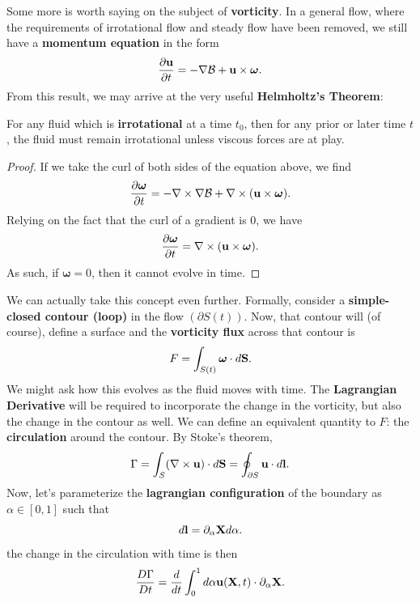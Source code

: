 Some more is worth saying on the subject of \textbf{vorticity}. In a general flow, where the requirements of irrotational flow and steady flow have been removed, we still have a \textbf{momentum equation} in the form
\[
\frac{\partial {\bf u}}{\partial t} = - \nabla \mathcal{B} + {\bf u} \times \boldsymbol{\omega}.
\]
From this result, we may arrive at the very useful \textbf{Helmholtz's Theorem}:
\vspace{0.6 cm}
\begin{theorem}
For any fluid which is \textbf{irrotational} at a time $t_0$, then for any prior or later time $t$, the fluid must remain irrotational unless viscous forces are at play.
\end{theorem}
\begin{proof}
    If we take the curl of both sides of the equation above, we find
    \[
    \frac{\partial \boldsymbol{\omega}}{\partial t} = - \nabla \times \nabla \mathcal{B} + \nabla \times ({\bf u} \times \boldsymbol{\omega}).
    \]
    Relying on the fact that the curl of a gradient is 0, we have
    \[
    \frac{\partial \boldsymbol{\omega}}{\partial t} = \nabla \times ({\bf u} \times \boldsymbol{\omega}).
    \]
    As such, if $\boldsymbol{\omega} = 0$, then it cannot evolve in time.
\end{proof}
\vspace{0.6cm}
We can actually take this concept even further. Formally, consider a \textbf{simple-closed contour (loop)} in the flow $(\partial S(t))$.  Now, that contour will (of course), define a surface and the \textbf{vorticity flux} across that contour is
\[
F = \int_{S(t)} \boldsymbol{\omega} \cdot d{\bf S}. 
\]
We might ask how this evolves as the fluid moves with time. The \textbf{Lagrangian Derivative} will be required to incorporate the change in the vorticity, but also the change in the contour as well. We can define an equivalent quantity to $F$: the \textbf{circulation} around the contour. By Stoke's theorem,
\[
\Gamma = \int_S (\nabla \times  {\bf u}) \cdot d{\bf S} = \oint_{\partial S} {\bf u} \cdot d{\bf l}. 
\]
Now, let's parameterize the \textbf{lagrangian configuration} of the boundary as $\alpha \in [0,1]$ such that
\[
d{\bf l} = \partial_\alpha {\bf X} d\alpha.
\]
the change in the circulation with time is then
\[
\frac{D\Gamma}{Dt} = \frac{d}{dt} \int_0^1 d\alpha {\bf u}({\bf X},t) \cdot \partial_\alpha {\bf X}.
\]
